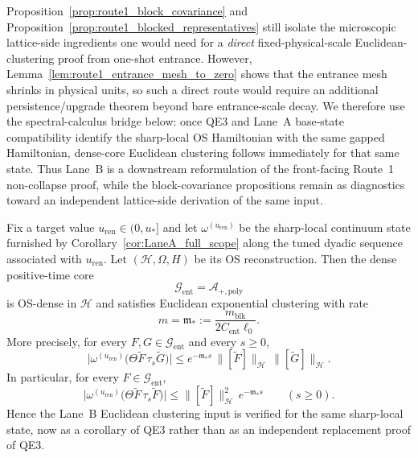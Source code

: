\begin{remark}\label{rem:route1_dense_core_status}
Proposition~\ref{prop:route1_block_covariance} and Proposition~\ref{prop:route1_blocked_representatives}
still isolate the microscopic lattice-side ingredients one would need for a \emph{direct}
fixed-physical-scale Euclidean-clustering proof from one-shot entrance.
However, Lemma~\ref{lem:route1_entrance_mesh_to_zero} shows that the entrance mesh shrinks in physical units, so such a direct route
would require an additional persistence/upgrade theorem beyond bare entrance-scale decay.
We therefore use the spectral-calculus bridge below:
once QE3 and Lane~A base-state compatibility identify the sharp-local OS Hamiltonian with the same gapped Hamiltonian, dense-core
Euclidean clustering follows immediately for that same state.
Thus Lane~B is a downstream reformulation of the front-facing Route~1 non-collapse proof,
while the block-covariance propositions remain as diagnostics toward an independent lattice-side derivation of the same input.
\end{remark}

\begin{theorem}
\label{thm:route1_E2_internal}
Fix a target value $u_{\mathrm{ren}}\in(0,u_\ast]$ and let $\omega^{(u_{\mathrm{ren}})}$ be the sharp-local continuum state
furnished by Corollary~\ref{cor:LaneA_full_scope} along the tuned dyadic sequence associated with $u_{\mathrm{ren}}$.
Let $(\mathcal H,\Omega,H)$ be its OS reconstruction.
Then the dense positive-time core
\[
\mathcal G_{\mathrm{ent}}=\mathcal A_{+,\mathrm{poly}}
\]
is OS-dense in $\mathcal H$ and satisfies Euclidean exponential clustering with rate
\begin{equation}\label{eq:route1_mstar_densecore}
 m=\mathfrak m_\ast:=\frac{m_{\mathrm{blk}}}{2C_{\mathrm{ent}}\ell_0}.
\end{equation}
More precisely, for every $F,G\in\mathcal G_{\mathrm{ent}}$ and every $s\ge 0$,
\begin{equation}\label{eq:route1_core_continuum_E2_cross}
 \big|\omega^{(u_{\mathrm{ren}})}\big(\Theta \widetilde F\,\tau_s\widetilde G\big)\big|
 \le e^{-\mathfrak m_\ast s}\,\|[\widetilde F]\|_{\mathcal H}\,\|[\widetilde G]\|_{\mathcal H}.
\end{equation}
In particular, for every $F\in\mathcal G_{\mathrm{ent}}$,
\begin{equation}\label{eq:route1_core_continuum_E2}
 \big|\omega^{(u_{\mathrm{ren}})}\big(\Theta \widetilde F\,\tau_s\widetilde F\big)\big|
 \le \|[\widetilde F]\|_{\mathcal H}^{2}\,e^{-\mathfrak m_\ast s}
 \qquad (s\ge 0).
\end{equation}
Hence the Lane~B Euclidean clustering input is verified for the same sharp-local state, now as a corollary of QE3 rather than as an independent replacement proof of QE3.
\end{theorem}

